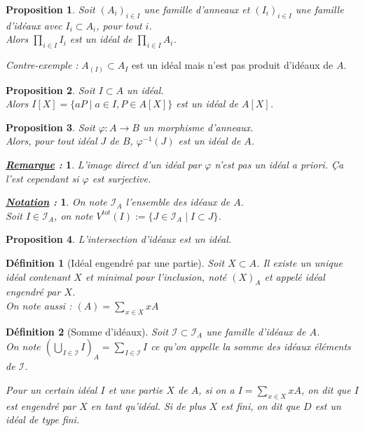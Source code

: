 \documentclass{article}           %
\newcommand\set[1]{\mathbb{#1}} 				%
\newcommand\cali[1]{\mathcal{#1}} 				%
\newcommand\summ[2]{\underset{#1}{\overset{#2}{\sum}}} 		%
\newcommand\prodd[2]{\underset{#1}{\overset{#2}{\prod}}} 	%
\newcommand\cupp[2]{\underset{#1}{\overset{#2}{\bigcup}}} 	%
\theoremstyle{break}
\theoremstyle{add}
\theoremstyle{break} %
\newtheorem{definition}{Définition}[section]
\newtheorem{proposition}{Proposition}[section]
\theoremstyle{add}
\newtheorem*{remarque}{\textit{\underline{Remarque} : }}
\newtheorem*{notation}{\textit{\underline{Notation} : }}
\begin{document}
\begin{proposition}
Soit $(A_i)_{i \in I}$ une famille d'anneaux et $(I_i)_{i \in I}$ une famille d'idéaux avec $I_i \subset A_i$, pour tout $i$. \\
Alors $\prodd{i \in I}{} I_i$ est un idéal de $\prodd{i \in I}{} A_i$.
\end{proposition}

\textit{Contre-exemple :} $A_{(I)} \subset A_I$ est un idéal mais n'est pas produit d'idéaux de $A$. \\

\begin{proposition}
Soit $I \subset A$ un idéal. \\
Alors $I[X] = \{ aP \;|\; a\in I, P \in A[X] \}$ est un idéal de $A[X]$.
\end{proposition}


\begin{proposition}
Soit $\varphi : A \rightarrow B$ un morphisme d'anneaux. \\
Alors, pour tout idéal $J$ de $B$, $\varphi^{-1}(J)$ est un idéal de $A$.
\end{proposition}


\begin{remarque}
L'image direct d'un idéal par $\varphi$ n'est pas un idéal \textit{a priori}. Ça l'est cependant si $\varphi$ est surjective.
\end{remarque}

\begin{notation}
On note $\cali{I}_A$ l'ensemble des idéaux de $A$. \\
Soit $I \in \cali{I}_A$, on note $V^{tot}(I) := \{ J \in \cali{I}_A \;|\; I \subset J \}$.
\end{notation}

\begin{proposition}
L'intersection d'idéaux est un idéal.
\end{proposition}


\begin{definition}[Idéal engendré par une partie]
Soit $X \subset A$. Il existe un unique idéal contenant $X$ et minimal pour l'inclusion, noté $(X)_A$ et appelé \textit{idéal engendré} par $X$. \\

On note aussi : $(A) = \summ{x \in X}{} xA$
\end{definition}

\begin{definition}[Somme d'idéaux]
Soit $\cali{I} \subset \cali{I}_A$ une famille d'idéaux de $A$. \\
On note $(\cupp{I \in \cali{I}}{} I)_A = \summ{I \in \cali{I}}{} I$ ce qu'on appelle la somme des idéaux éléments de $\cali{I}$.

Pour un certain idéal $I$ et une partie $X$ de $A$, si on a $I = \summ{x \in X}{} xA$, on dit que $I$ est engendré par $X$ en tant qu'idéal. 
Si de plus $X$ est fini, on dit que $D$ est un idéal de type fini. \\
\end{definition}
\end{document}
